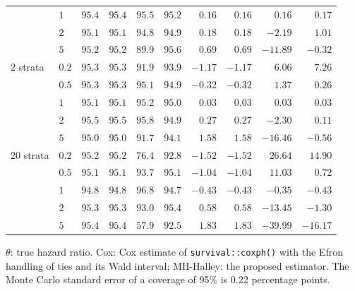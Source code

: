 \begin{table}
\begin{tabular}{llrrrrrrrr}
 & $1$ & $95.4$ & $95.4$ & $95.5$ & $95.2$ & $0.16$ & $0.16$ & $0.16$ & $0.17$ \\
 & $2$ & $95.1$ & $95.1$ & $94.8$ & $94.9$ & $0.18$ & $0.18$ & $-2.19$ & $1.01$ \\
 & $5$ & $95.2$ & $95.2$ & $89.9$ & $95.6$ & $0.69$ & $0.69$ & $-11.89$ & $-0.32$ \\
\midrule
2 strata & $0.2$ & $95.3$ & $95.3$ & $91.9$ & $93.9$ & $-1.17$ & $-1.17$ & $6.06$ & $7.26$ \\
 & $0.5$ & $95.3$ & $95.3$ & $95.1$ & $94.9$ & $-0.32$ & $-0.32$ & $1.37$ & $0.26$ \\
 & $1$ & $95.1$ & $95.1$ & $95.2$ & $95.0$ & $0.03$ & $0.03$ & $0.03$ & $0.03$ \\
 & $2$ & $95.5$ & $95.5$ & $95.8$ & $94.9$ & $0.27$ & $0.27$ & $-2.30$ & $0.11$ \\
 & $5$ & $95.0$ & $95.0$ & $91.7$ & $94.1$ & $1.58$ & $1.58$ & $-16.46$ & $-0.56$ \\
\midrule
20 strata & $0.2$ & $95.2$ & $95.2$ & $76.4$ & $92.8$ & $-1.52$ & $-1.52$ & $26.64$ & $14.90$ \\
 & $0.5$ & $95.1$ & $95.1$ & $93.7$ & $95.1$ & $-1.04$ & $-1.04$ & $11.03$ & $0.72$ \\
 & $1$ & $94.8$ & $94.8$ & $96.8$ & $94.7$ & $-0.43$ & $-0.43$ & $-0.35$ & $-0.43$ \\
 & $2$ & $95.3$ & $95.3$ & $93.0$ & $95.4$ & $0.58$ & $0.58$ & $-13.45$ & $-1.30$ \\
 & $5$ & $95.4$ & $95.4$ & $57.9$ & $92.5$ & $1.83$ & $1.83$ & $-39.99$ & $-16.17$ \\
\bottomrule
\end{tabular}
\par\smallskip
{\footnotesize $\theta$: true hazard ratio. Cox: Cox estimate of \texttt{survival::coxph()} with the Efron handling of ties and its Wald interval; MH-Halley: the proposed estimator. The Monte Carlo standard error of a coverage of 95\% is 0.22 percentage points.\par}
\end{table}
